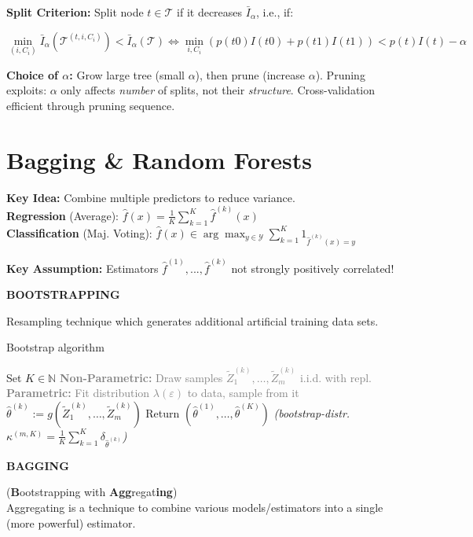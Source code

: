 \documentclass[a4paper,10pt]{article}
\newcommand{\subtitle}[1]{\vspace{0.25cm}\begin{normalsize}\textbf{\textcolor{gray!150}{\uppercase{#1}}}\end{normalsize}}
\begin{document}
\begin{small}
\textbf{Split Criterion:} Split node $t \in \mathcal{T}$ if it decreases $\bar{I}_\alpha$, i.e., if:
\begin{scriptsize}
$$
\min_{(i, C_{i})} \bar{I}_\alpha\left(\mathcal{T}^{(t, i, C_{i})}\right) < \bar{I}_\alpha(\mathcal{T}) \Leftrightarrow 
\min_{i,C_i}(p(t0)I(t0) + p(t1)I(t1)) < p(t)I(t) - \alpha
$$
\end{scriptsize}

\textbf{Choice of $\alpha$:} Grow large tree (small $\alpha$), then prune (increase $\alpha$). Pruning exploits: $\alpha$ only affects \textit{number} of splits, not their \textit{structure}. Cross-validation efficient through pruning sequence.

\section{Bagging \& Random Forests}

\textbf{Key Idea:} Combine multiple predictors to reduce variance.\\
\textbf{Regression} (Average): $\hat{f}(x) = \frac{1}{K} \sum_{k=1}^{K} \hat{f}^{(k)}(x)$ \\
\textbf{Classification} (Maj. Voting): $\hat{f}(x) \in \arg \max_{y \in \mathcal{Y}} \sum_{k=1}^{K} 1_{\hat{f}^{(k)}(x) = y}$

\textbf{Key Assumption:} Estimators $\hat{f}^{(1)},...,\hat{f}^{(k)}$ not strongly positively correlated!

\subtitle{Bootstrapping} 

Resampling technique which generates additional artificial training data sets.

\begin{algorithm}[H]
\scriptsize
\caption{Bootstrap algorithm}
\begin{algorithmic}[1]
\State Set $K \in \mathbb{N}$
    \State \textcolor{gray}{\textbf{Non-Parametric:} Draw samples $\tilde{Z}_1^{(k)},\ldots,\tilde{Z}_m^{(k)}$ i.i.d. with repl.}
    \State \textcolor{gray}{\textbf{Parametric:} Fit distribution $\lambda(\varepsilon)$ to data, sample from it}
    \State $\hat{\theta}^{(k)} := g(\tilde{Z}_1^{(k)}, \dots, \tilde{Z}_m^{(k)})$
\EndFor
\State Return $(\hat{\theta}^{(1)}, \dots, \hat{\theta}^{(K)})$ \textit{(bootstrap-distr. $\kappa^{(m, K)} = \frac{1}{K} \sum_{k=1}^K \delta_{\hat{\theta}^{(k)}}$)}
\end{algorithmic}
\end{algorithm}

\subtitle{Bagging} (\textbf{B}ootstrapping with \textbf{Agg}regat\textbf{ing}) \\
Aggregating is a technique to combine various models/estimators into a single (more powerful) estimator.


\end{small}
\end{document}
